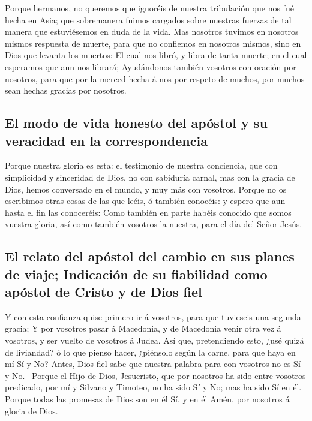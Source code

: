  Porque hermanos, no queremos que ignoréis de nuestra
tribulación que nos fué hecha en Asia; que sobremanera fuimos cargados
sobre nuestras fuerzas de tal manera que estuviésemos en duda de la
vida.  Mas nosotros tuvimos en nosotros mismos respuesta
de muerte, para que no confiemos en nosotros mismos, sino en Dios que
levanta los muertos:  El cual nos libró, y libra de tanta
muerte; en el cual esperamos que aun nos librará; 
Ayudándonos también vosotros con oración por nosotros, para que por la
merced hecha á nos por respeto de muchos, por muchos sean hechas gracias
por nosotros.

\hypertarget{el-modo-de-vida-honesto-del-apuxf3stol-y-su-veracidad-en-la-correspondencia}{%
\subsection{El modo de vida honesto del apóstol y su veracidad en la
correspondencia}\label{el-modo-de-vida-honesto-del-apuxf3stol-y-su-veracidad-en-la-correspondencia}}

 Porque nuestra gloria es esta: el testimonio de nuestra
conciencia, que con simplicidad y sinceridad de Dios, no con sabiduría
carnal, mas con la gracia de Dios, hemos conversado en el mundo, y muy
más con vosotros.  Porque no os escribimos otras cosas de
las que leéis, ó también conocéis: y espero que aun hasta el fin las
conoceréis:  Como también en parte habéis conocido que
somos vuestra gloria, así como también vosotros la nuestra, para el día
del Señor Jesús.

\hypertarget{el-relato-del-apuxf3stol-del-cambio-en-sus-planes-de-viaje-indicaciuxf3n-de-su-fiabilidad-como-apuxf3stol-de-cristo-y-de-dios-fiel}{%
\subsection{El relato del apóstol del cambio en sus planes de viaje;
Indicación de su fiabilidad como apóstol de Cristo y de Dios
fiel}\label{el-relato-del-apuxf3stol-del-cambio-en-sus-planes-de-viaje-indicaciuxf3n-de-su-fiabilidad-como-apuxf3stol-de-cristo-y-de-dios-fiel}}

 Y con esta confianza quise primero ir á vosotros, para
que tuvieseis una segunda gracia;  Y por vosotros pasar á
Macedonia, y de Macedonia venir otra vez á vosotros, y ser vuelto de
vosotros á Judea.  Así que, pretendiendo esto, ¿usé quizá
de liviandad? ó lo que pienso hacer, ¿piénsolo según la carne, para que
haya en mí Sí y No?  Antes, Dios fiel sabe que nuestra
palabra para con vosotros no es Sí y No.~ Porque el Hijo
de Dios, Jesucristo, que por nosotros ha sido entre vosotros predicado,
por mí y Silvano y Timoteo, no ha sido Sí y No; mas ha sido Sí en él.
 Porque todas las promesas de Dios son en él Sí, y en él
Amén, por nosotros á gloria de Dios.

